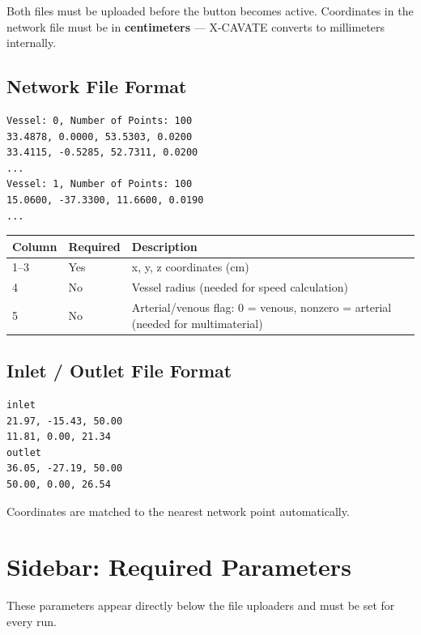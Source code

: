 \documentclass[11pt,letterpaper]{article}
\newcommand{\btn}[1]{\fbox{\textsf{#1}}}
\begin{document}
\begin{warnbox}
Both files must be uploaded before the \btn{Run X-CAVATE} button becomes active.
Coordinates in the network file must be in \textbf{centimeters} --- X-CAVATE
converts to millimeters internally.
\end{warnbox}

\subsection{Network File Format}

\begin{lstlisting}
Vessel: 0, Number of Points: 100
33.4878, 0.0000, 53.5303, 0.0200
33.4115, -0.5285, 52.7311, 0.0200
...
Vessel: 1, Number of Points: 100
15.0600, -37.3300, 11.6600, 0.0190
...
\end{lstlisting}

\begin{tabularx}{\textwidth}{l l X}
\toprule
\textbf{Column} & \textbf{Required} & \textbf{Description} \\
\midrule
1--3 & Yes & x, y, z coordinates (cm) \\
4    & No  & Vessel radius (needed for speed calculation) \\
5    & No  & Arterial/venous flag: 0 = venous, nonzero = arterial (needed for multimaterial) \\
\bottomrule
\end{tabularx}

\subsection{Inlet / Outlet File Format}

\begin{lstlisting}
inlet
21.97, -15.43, 50.00
11.81, 0.00, 21.34
outlet
36.05, -27.19, 50.00
50.00, 0.00, 26.54
\end{lstlisting}

Coordinates are matched to the nearest network point automatically.

\section{Sidebar: Required Parameters}
\label{sec:required-params}

These parameters appear directly below the file uploaders and must be set for
every run.
\end{document}
